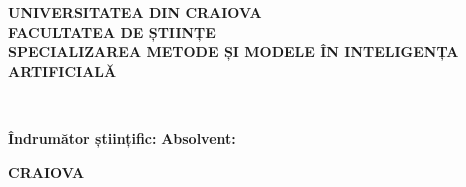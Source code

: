 \begin{titlepage}
    \centering
    \vspace*{1cm}
    
    {\Large \textbf{UNIVERSITATEA DIN CRAIOVA}\\[0.3cm]
    \textbf{FACULTATEA DE ȘTIINȚE}\\[0.3cm]
    \textbf{SPECIALIZAREA METODE ȘI MODELE ÎN INTELIGENȚA}\\[0.3cm]
    \textbf{ARTIFICIALĂ}\\[2cm]}
    
    {\LARGE \textbf{\titluLucrare}\\[3cm]}
    
    \begin{flushleft}
    \large
    \textbf{Îndrumător științific:} \hfill \textbf{Absolvent:}\\
    \textbf{\numeCoordonator} \hfill \textbf{\numeStudent}
    \end{flushleft}
    
    \vfill
    
    {\large \textbf{CRAIOVA\\\anLucrare}}
    
\end{titlepage}
